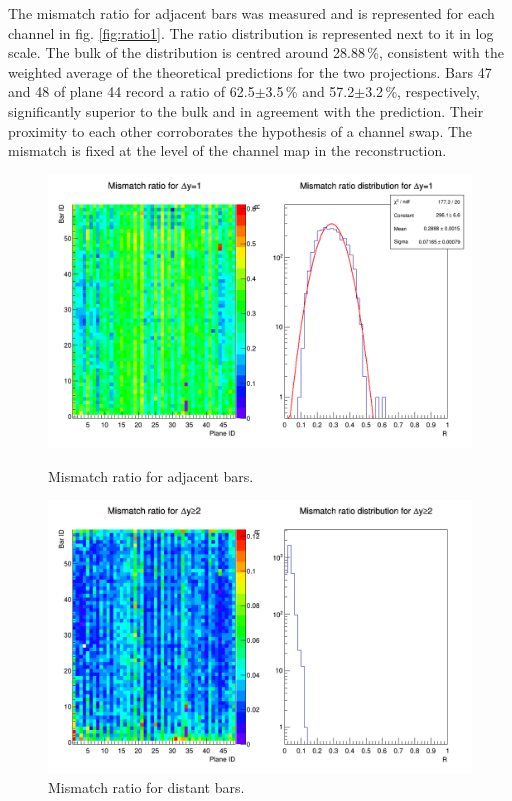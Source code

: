 \documentclass[a4paper,11pt]{article}
\begin{document}
The mismatch ratio for adjacent bars was measured and is represented for each channel in fig. \ref{fig:ratio1}. The ratio distribution is represented next to it in log scale. The bulk of the distribution is centred around 28.88\,\%, consistent with the weighted average of the theoretical predictions for the two projections. Bars 47 and 48 of plane 44 record a ratio of 62.5$\pm$3.5\,\% and 57.2$\pm$3.2\,\%, respectively, significantly superior to the bulk and in agreement with the prediction. Their proximity to each other corroborates the hypothesis of a channel swap. The mismatch is fixed at the level of the channel map in the reconstruction.

\begin{figure}[htr!]
  \begin{minipage}[b]{.49\textwidth}
   \centering
   \includegraphics[width=\textwidth]{ratio1.png}
   \caption{Mismatch ratio for adjacent bars.}
   \label{fig:ratio1}
  \end{minipage}
  \begin{minipage}[b]{.49\textwidth}
   \centering
   \includegraphics[width=\textwidth]{ratio2.png}
   \caption{Mismatch ratio for distant bars.}
   \label{fig:ratio2}
  \end{minipage}
\end{figure}
\end{document}
